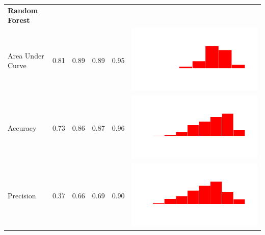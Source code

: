 \begin{table}
\begin{tabular}{lrrrrc}
    \bf{Random Forest}\\
    Area Under Curve & 0.81 & 0.89 & 0.89 & 0.95 & \includegraphics[scale = 0.1, clip = true, trim= 50px 60px 50px 60px]{../figs/hist-results/hist-RFauc.pdf} \\
    Accuracy & 0.73 & 0.86 & 0.87 & 0.96 & \includegraphics[scale = 0.1, clip = true, trim= 50px 60px 50px 60px]{../figs/hist-results/hist-RFacc.pdf} \\
    Precision & 0.37 & 0.66 & 0.69 & 0.90 & \includegraphics[scale = 0.1, clip = true, trim= 50px 60px 50px 60px]{../figs/hist-results/hist-RFprec.pdf} \\

\end{tabular}
\end{table}
